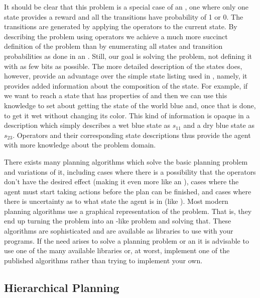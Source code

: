 It should be clear that this problem is a special case of an
, one where only one state provides a reward and all the
transitions have probability of 1 or 0. The transitions are generated
by applying the operators to the current state. By describing the
problem using operators we achieve a much more succinct definition of
the problem than by enumerating all states and transition
probabilities as done in an . Still, our goal is solving the
problem, not defining it with as few bits as possible.  The more
detailed description of the states does, however, provide an advantage
over the simple state listing used in , namely, it provides
added information about the composition of the state. For example, if
we want to reach a state that has properties of  and
 then we can use this knowledge to set about getting the
state of the world blue and, once that is done, to get it wet without
changing its color. This kind of information is opaque in a 
description which simply describes a wet blue state as $s_{11}$ and a
dry blue state as $s_{23}$. Operators and their corresponding state
descriptions thus provide the agent with more knowledge about the
problem domain.

There exists many planning algorithms which solve the basic planning
problem and variations of it, including cases where there is a
possibility that the operators don't have the desired effect (making
it even more like an ), cases where the agent must start
taking actions before the plan can be finished, and cases where there
is uncertainty as to what state the agent is in (like ).
Most modern planning algorithms use a graphical representation of the
problem. That is, they end up turning the problem into an
-like problem and solving that.  These algorithms are
sophisticated and are available as libraries to use with your
programs.   If the need arises to solve a planning problem or
an  it is advisable to use one of the many available
libraries or, at worst, implement one of the published algorithms
rather than trying to implement your own.


\subsection{Hierarchical Planning}
\label{sec:hier-plann}

